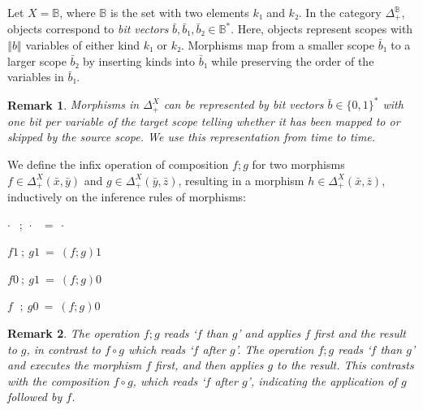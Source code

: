 \documentclass[runningheads]{llncs}
\newtheorem*{remark}{Remark}
\begin{document}
\begin{example}
  Let $X = 𝔹$, where $𝔹$ is the set with two elements $k₁$ and $k₂$. 
  In the category $Δ_+^𝔹$, objects correspond to \emph{bit vectors} $\bar{b}, \bar{b}₁, \bar{b}₂ ∈ 𝔹^*$. 
  Here, objects represent scopes with $‖b‖$ variables of either kind $k₁$ or $k₂$. 
  Morphisms map from a smaller scope $\bar{b}₁$ to a larger scope $\bar{b}₂$ by inserting kinds into $\bar{b}₁$ while preserving the order of the variables in $\bar{b}₁$.
  \label{ex:ex1}
\end{example}
\begin{remark}
  Morphisms in $Δ_+^X$ can be represented by \emph{bit vectors} $\bar{b} ∈ \{0, 1\}^*$ with one bit per variable of the target scope telling whether it has been mapped to or skipped by the source scope. 
  We use this representation from time to time.
\end{remark}
\begin{definition}
  We define the infix operation of composition $f;g$ for two morphisms $f ∈ Δ_+^X(\bar{x}, \bar{y})$ and $g ∈ Δ_+^X(\bar{y}, \bar{z})$, resulting in a morphism $h ∈ Δ_+^X(\bar{x}, \bar{z})$, inductively on the inference rules of morphisms:

  \quad $·  \ \ \, \, ; \ · \ \ \ = \ ·$

  \quad $f 1  \ ; \ g 1 \ = \ (f;g)1$

  \quad $f 0 \ ; \ g 1  \ = \ (f;g)0$

  \quad $f \ \ \, ; \ g 0 \ = \ (f;g)0$
\end{definition}
\begin{remark}
  The operation $f;g$ reads `$f$ than $g$' and applies $f$ first and the result to $g$, in contrast to $f ∘ g$ which reads `$f$ after $g$'. 
  The operation $f;g$ reads `$f$ than $g$' and executes the morphism $f$ first, and then applies $g$ to the result. 
  This contrasts with the composition $f ∘ g$, which reads `$f$ after $g$', indicating the application of $g$ followed by $f$.
\end{remark}
\end{document}
